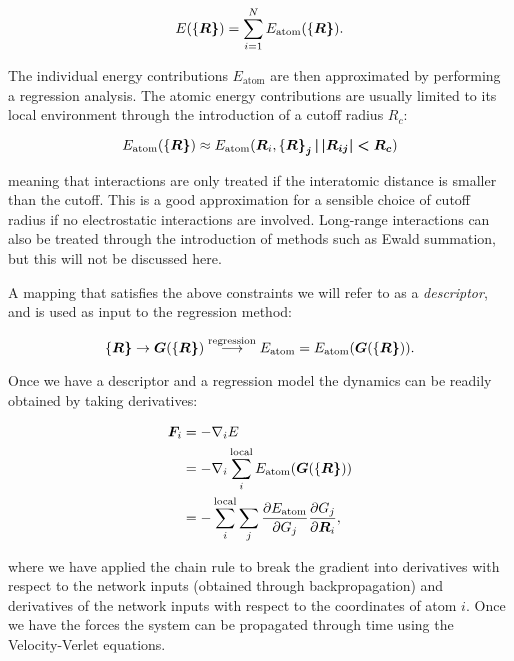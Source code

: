 \begin{equation}
 E(\left\{\bm{R\right\}}) = \sum_{i=1}^N E_{\text{atom}}(\left\{\bm{R\right\}}) . 
\end{equation}

The individual energy contributions $E_{\text{atom}}$
are then approximated by performing a regression analysis.
The atomic energy contributions are usually limited to its
local environment through the introduction of a cutoff radius $R_c$:

\begin{equation}
 E_{\text{atom}} (\left\{\bm{R\right\}}) \approx
    E_{\text{atom}} (\bm{R}_i, \left\{\bm{R\right\}_j | \left| \bm{R}_{ij} \right|
    < R_c}) 
\end{equation}

meaning that interactions are only treated if the interatomic distance
is smaller than the cutoff. This is a good approximation for a sensible
choice of cutoff radius if no electrostatic interactions are involved.
Long-range interactions can also be treated through
the introduction of methods such as Ewald summation, but this will
not be discussed here.
\par
A mapping that satisfies the above constraints we will refer to
as a \textit{descriptor}, and is used as input to the regression method:

\begin{equation}
    \left\{\bm{R\right\}} \rightarrow \bm{G}(\left\{\bm{R\right\}}) 
    \overset{\text{regression}}
    {\longrightarrow} E_{\text{atom}} =
    E_{\text{atom}}(\bm{G}(\left\{\bm{R\right\}})). 
\end{equation}

Once we have a descriptor and a regression model the dynamics
can be readily obtained by taking derivatives:

\begin{equation}
\begin{split}
    \bm{F}_i &= -\nabla_i E \\
    &= -\nabla_i \sum_i^{\text{local}}
    E_{\text{atom}}(\bm{G}(\left\{\bm{R\right\}})) \\
    &= -\sum_i^{\text{local}} \sum_j \frac{\partial E_{\text{atom}}}
    {\partial G_j} \frac{\partial G_j}{\partial \bm{R}_i} ,
\end{split}
\end{equation}

where we have applied the chain rule to break the gradient
into derivatives with respect to the network inputs (obtained through
backpropagation) and derivatives of the network inputs with
respect to the coordinates of atom $i$.
Once we have the forces the system can be propagated through time
using the Velocity-Verlet equations.

